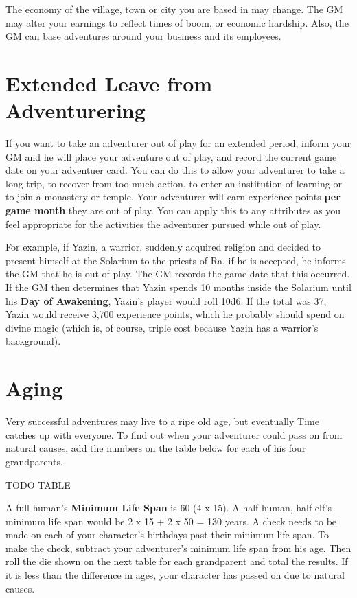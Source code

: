 \begin{multicols*}{2}
The economy of the village, town or city you are based in may change. The GM may alter your earnings to reflect times of boom, or economic hardship. Also, the GM can base adventures around your business and its employees.
\section{Extended Leave from Adventurering}
If you want to take an adventurer out of play for an extended period, inform your GM and he will place your adventure out of play, and record the current game date on
your adventuer card. You can do this to allow your adventurer to take a long trip, to recover from too much action, to enter an institution of learning or to join a monastery or temple. Your adventurer will earn  experience
points \textbf{per game month} they are out of play. You can apply this to any attributes as you feel appropriate for the activities the adventurer pursued while out of play. 

For example, if Yazin, a warrior, suddenly acquired religion and decided to present himself at the Solarium to the priests of Ra, if he is accepted, he informs the GM that he is out of play. The GM records the game date that this occurred. If the GM then determines that Yazin spends 10 months inside the Solarium until his \textbf{Day of Awakening}, Yazin’s player would roll 10d6. If the total was 37, Yazin would receive 3,700 experience points, which he probably should spend on divine magic (which is, of course, triple cost because Yazin has a warrior’s background).
\section{Aging}
Very successful adventures may live to a ripe old age, but eventually Time catches up with everyone. To find out when your adventurer could pass on from natural causes,
add the numbers on the table below for each of his four grandparents.

TODO TABLE

A full human’s \textbf{Minimum Life Span} is 60 (4 x 15). A half-human, half-elf’s minimum life span would be 2 x 15 + 2 x 50 = 130 years. A check needs to be made on each of your character’s birthdays past their minimum life span. To make the check, subtract your adventurer’s minimum life span from his age. Then roll the die shown on the next table for each grandparent and total the results. If it is less than the difference in ages, your character has passed on due to natural causes.


\end{multicols*}
